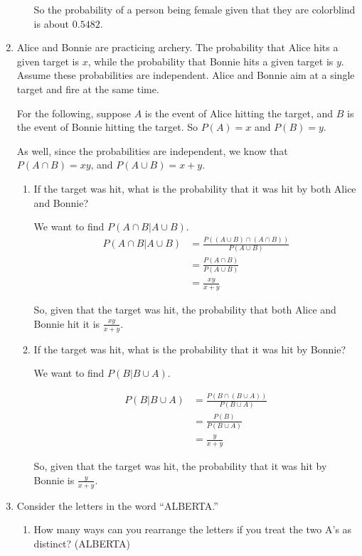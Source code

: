 \documentclass{article}
\begin{document}
\begin{enumerate}
\begin{enumerate}[label= (\alph*)]
            So the probability of a person being female given that they are colorblind 
            is about $0.5482$.
            \end{enumerate}
            \newpage
    \item Alice and Bonnie are practicing archery. The probability that Alice hits a given target is $x$, while the probability that Bonnie hits a given target is $y$. Assume these probabilities are independent. Alice and Bonnie aim at a single target and fire at the same time.
        
        For the following, suppose $A$ is the event of Alice hitting the target, and 
        $B$ is the event of Bonnie hitting the target.
        So $P(A)=x$ and $P(B)=y$.

        As well, since the probabilities are independent, we know that $P(A\cap B)=xy$,
        and $P(A\cup B)=x+y$.

        \begin{enumerate}[label= (\alph*)] 
        \item If the target was hit, what is the probability that it was hit by both Alice and Bonnie?

        We want to find $P(A\cap B|A\cup B)$.
        \begin{align*} 
            P(A\cap B|A\cup B)&=\frac{P((A\cup B)\cap(A\cap B))}{P(A\cup B)}\\
            &=\frac{P(A\cap B)}{P(A\cup B)}\\
            &=\frac{xy}{x+y}
        \end{align*}

        So, given that the target was hit, the probability that both Alice and Bonnie hit it is $\frac{xy}{x+y}$.

        \item If the target was hit, what is the probability that it was hit by Bonnie?

        We want to find $P(B|B\cup A)$.

        \begin{align*} 
            P(B|B\cup A)&=\frac{P(B\cap(B\cup A))}{P(B\cup A)}\\
            &=\frac{P(B)}{P(B\cup A)}\\
            &=\frac{y}{x+y}
        \end{align*}

        So, given that the target was hit, the probability that it was hit by Bonnie is $\frac{y}{x+y}$.
        \end{enumerate}
    \item Consider the letters in the word “ALBERTA.”
        \begin{enumerate}[label= (\alph*)] 
        \item How many ways can you rearrange the letters if you treat the two A's as distinct?
        (ALBERTA)
        

\end{enumerate}
\end{enumerate}
\end{document}
